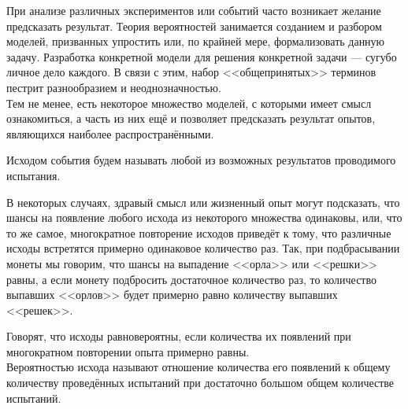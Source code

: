 \documentclass[a4paper,12pt]{article}
\begin{document}

При анализе различных экспериментов или событий часто возникает желание предсказать результат.
Теория вероятностей занимается созданием и разбором моделей, призванных упростить или, по крайней мере, формализовать данную задачу. Разработка конкретной модели для решения конкретной задачи --- сугубо личное дело каждого.
В связи с этим, набор <<общепринятых>> терминов пестрит разнообразием и неоднозначностью.\\
Тем не менее, есть некоторое множество моделей, с которыми имеет смысл ознакомиться,
а часть из них ещё и позволяет предсказать результат опытов, являющихся наиболее распространёнными.


     Исходом события будем называть  любой из возможных результатов проводимого испытания.


В некоторых случаях, здравый смысл или жизненный опыт могут подсказать, что шансы на появление любого исхода из некоторого множества одинаковы, или, что то же самое, многократное повторение исходов приведёт к тому, что различные исходы встретятся примерно одинаковое количество раз. Так, при подбрасывании монеты мы говорим, что шансы на выпадение <<орла>> или <<решки>> равны, а если монету подбросить достаточное количество раз, то количество выпавших <<орлов>> будет примерно равно количеству выпавших <<решек>>.

  Говорят, что исходы  равновероятны, если количества их появлений при многократном повторении опыта примерно равны.\\
   Вероятностью исхода называют отношение количества его появлений к общему количеству проведённых испытаний при достаточно большом общем количестве испытаний.
\end{document}
